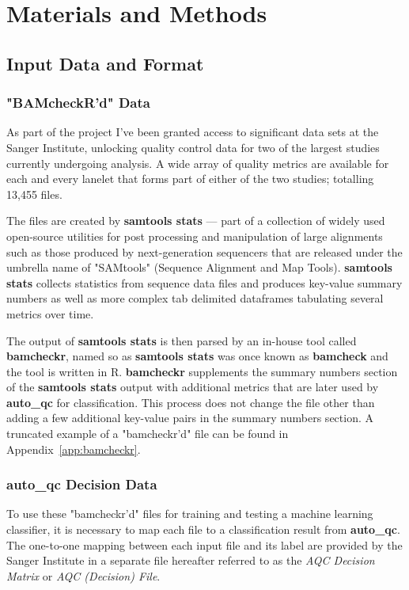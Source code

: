 \chapter{Materials and Methods}
\section{Input Data and Format}
\subsection{"BAMcheckR'd" Data}
\label{chap:bamcheckr-data}

As part of the project I've been granted access to significant data sets at the
Sanger Institute, unlocking quality control data for two of the largest studies
currently undergoing analysis. A wide array of quality metrics are available for
each and every lanelet that forms part of either of the two studies; totalling
13,455 files.


The files are created by \textbf{samtools stats} --- part of a collection of
widely used open-source utilities for post processing and manipulation of large
alignments such as those produced by next-generation sequencers that are
released under the umbrella name of "SAMtools"\citep{samtools} (Sequence Alignment and Map
Tools). \textbf{samtools stats} collects statistics from sequence data files %
and produces key-value summary numbers as well as more complex tab delimited
dataframes tabulating several metrics over time.

The output of \textbf{samtools stats} is then parsed by an in-house tool called
\textbf{bamcheckr}, named so as \textbf{samtools stats} was once known as
\textbf{bamcheck} and the tool is written in R. \textbf{bamcheckr} supplements
the summary numbers section of the \textbf{samtools stats} output with
additional metrics that are later used by \textbf{auto\_qc} for classification.
This process does not change the file other than adding a few additional
key-value pairs in the summary numbers section. A truncated example of a
"bamcheckr'd" file can be found in Appendix~\ref{app:bamcheckr}.

\subsection{auto\_qc Decision Data}
To use these "bamcheckr'd" files for training and testing a machine learning
classifier, it is necessary to map each file to a classification result from
\textbf{auto\_qc}. The one-to-one mapping between each input file and its label
are provided by the Sanger Institute in a separate file hereafter referred to as
the \textit{AQC Decision Matrix} or \textit{AQC (Decision) File}.

